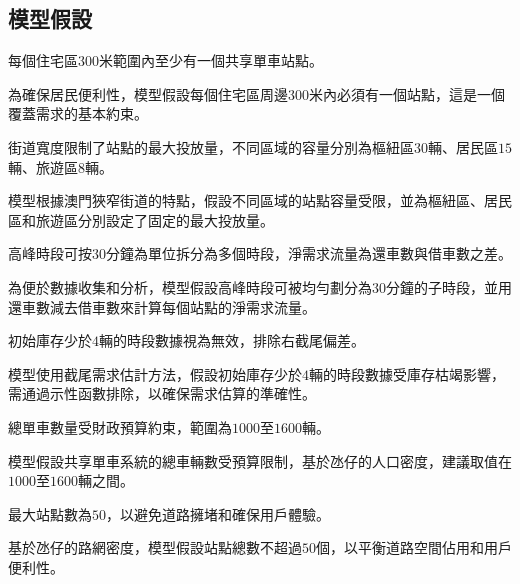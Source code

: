 \subsection{模型假設}
\begin{assumption}
每個住宅區\(300\)米範圍內至少有一個共享單車站點。
\end{assumption}
\begin{explanation}
為確保居民便利性，模型假設每個住宅區周邊\(300\)米內必須有一個站點，這是一個覆蓋需求的基本約束。
\end{explanation}
\begin{assumption}
街道寬度限制了站點的最大投放量，不同區域的容量分別為樞紐區\(30\)輛、居民區\(15\)輛、旅遊區\(8\)輛。
\end{assumption}
\begin{explanation}
模型根據澳門狹窄街道的特點，假設不同區域的站點容量受限，並為樞紐區、居民區和旅遊區分別設定了固定的最大投放量。
\end{explanation}
\begin{assumption}
高峰時段可按\(30\)分鐘為單位拆分為多個時段，淨需求流量為還車數與借車數之差。
\end{assumption}
\begin{explanation}
為便於數據收集和分析，模型假設高峰時段可被均勻劃分為\(30\)分鐘的子時段，並用還車數減去借車數來計算每個站點的淨需求流量。
\end{explanation}
\begin{assumption}
初始庫存少於\(4\)輛的時段數據視為無效，排除右截尾偏差。
\end{assumption}
\begin{explanation}
模型使用截尾需求估計方法，假設初始庫存少於\(4\)輛的時段數據受庫存枯竭影響，需通過示性函數排除，以確保需求估算的準確性。
\end{explanation}
\begin{assumption}
總單車數量受財政預算約束，範圍為\(1000\)至\(1600\)輛。
\end{assumption}
\begin{explanation}
模型假設共享單車系統的總車輛數受預算限制，基於氹仔的人口密度，建議取值在\(1000\)至\(1600\)輛之間。
\end{explanation}
\begin{assumption}
最大站點數為\(50\)，以避免道路擁堵和確保用戶體驗。
\end{assumption}
\begin{explanation}
基於氹仔的路網密度，模型假設站點總數不超過\(50\)個，以平衡道路空間佔用和用戶便利性。
\end{explanation}

